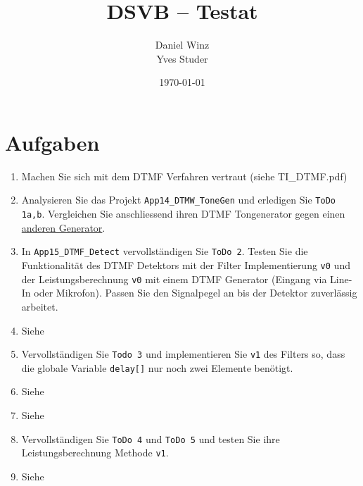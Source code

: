 \documentclass[a4,paper,fleqn]{article}
\title{DSVB -- Testat}
\date{\today}
\author{Daniel Winz\\Yves Studer}
\begin{document}
\maketitle
\clearpage

\section{Aufgaben}
\begin{enumerate}
    \item Machen Sie sich mit dem DTMF Verfahren vertraut (siehe TI\_DTMF.pdf)
    \item Analysieren Sie das Projekt \verb?App14_DTMW_ToneGen? und erledigen 
        Sie \verb?ToDo 1a,b?. Vergleichen Sie anschliessend ihren DTMF 
        Tongenerator gegen einen 
        \href{http://www.audiocheck.net/audiocheck_dtmf.php}{anderen Generator}.
        
        
    \item In \verb?App15_DTMF_Detect? vervollständigen Sie \verb?ToDo 2?. 
        Testen Sie die Funktionalität des DTMF Detektors mit der Filter 
        Implementierung \verb?v0? und der Leistungsberechnung \verb?v0? mit 
        einem DTMF Generator (Eingang via Line-In oder Mikrofon). Passen Sie 
        den Signalpegel an bis der Detektor zuverlässig arbeitet. 
        
        
    \item Siehe 
    \item Vervollständigen Sie \verb?Todo 3? und implementieren Sie \verb?v1? 
        des Filters so, dass die globale Variable \verb?delay[]? nur noch zwei 
        Elemente benötigt. 
        
    \item Siehe 
    \item Siehe 
    \item Vervollständigen Sie \verb?ToDo 4? und \verb?ToDo 5? und testen Sie 
        ihre Leistungsberechnung Methode \verb?v1?.
        
        
        
    \item Siehe 
\end{enumerate}
\end{document}
